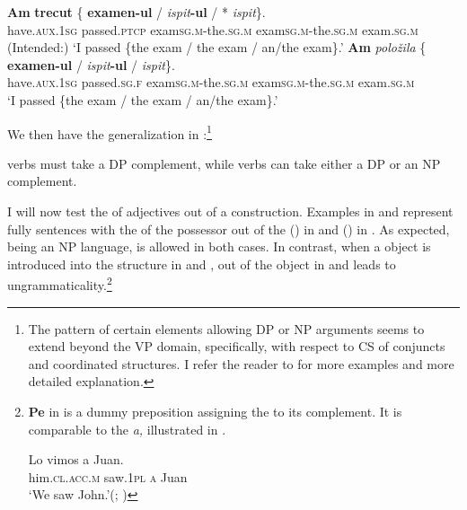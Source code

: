\documentclass[output=paper,hidelinks,newtxmath,]{langscibook}
\begin{document}
\ea \label{15:ex20}
	\ea\label{15:ex20a}
    \gll \textbf{Am} \textbf{trecut} \{\hspace{-2pt} \textbf{examen-ul} / \textit{ispit}\textbf{-ul} /\hspace{0.1cm} *\hspace{-2pt} \textit{ispit}\hspace{1pt}\}.\\          
         have\textsc{.aux.1sg} passed\textsc{.ptcp} {} exam\textsc{sg.m}-the\textsc{.sg.m} {} exam\textsc{sg.m}-the\textsc{.sg.m} {} {} exam\textsc{.sg.m}\\
         \glt (Intended:) `I passed \{the exam / the exam / an/the exam\}.'
	\ex\label{15:ex20b}
    \gll \textbf{Am} \textit{položila} \{\hspace{-2pt} \textbf{examen-ul} / \textit{ispit}\textbf{-ul} / \textit{ispit}\hspace{1pt}\}.\\
         have\textsc{.aux.1sg} passed\textsc{.sg.f} {} exam\textsc{sg.m}-the\textsc{.sg.m} {} exam\textsc{sg.m}-the\textsc{.sg.m} {} exam\textsc{.sg.m}\\
         \glt `I passed \{the exam / the exam / an/the exam\}.'
	\z
\z

\noindent We then have the generalization in :\footnote{\label{15:fn10}The pattern of certain elements allowing DP or NP arguments seems to extend beyond the VP domain, specifically, with respect to CS of conjuncts and coordinated structures. I refer the reader to \citet{Petroj} for more examples and more detailed explanation.}

\ea\label{15:ex21}
   verbs must take a DP complement, while  verbs can take either a DP or an NP complement.
\z

\noindent I will now test the  of adjectives out of a  construction. Examples in  and  represent fully  sentences with the  of the possessor out of the  () in  and  () in . As expected,  being an NP language,  is allowed in both cases. In contrast, when a  object is introduced into the structure in  and ,  out of the  object in  and  leads to ungrammaticality.\footnote{\label{15:fn11}\textbf{Pe} in  is a dummy preposition assigning the  to its complement. It is comparable to the  \textit{a,} illustrated in .

\ea \gll Lo vimos a Juan.\label{15:fn11ex}\\
him\textsc{.cl.acc.m} saw\textsc{.1pl} \textsc{a} Juan\\
\glt `We saw John.'\hfill(; \citealt{Jaeggli1986})
\z }
\end{document}
